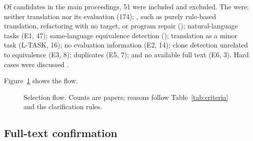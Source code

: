 Of  candidates in the main proceedings, 51 were included and  excluded. The  were: neither translation nor its evaluation (174); , such as purely rule-based translation, refactoring with no target, or program repair (); natural-language tasks (E1, 47); same-language equivalence detection (); translation as a minor task (L-TASK, 16); no evaluation information (E2, 14); clone detection unrelated to equivalence (E3, 8); duplicates (E5, 7); and no available full text (E6, 3). Hard cases were discussed .

\begin{added}
Figure~\ref{fig:flow} shows the flow. 
\end{added}

\begin{figure}[t]
  \centering
  
  \caption{\addedtag Selection flow. Counts are papers; reasons follow Table~\ref{tab:criteria} and the clarification rules.}
  \label{fig:flow}
\end{figure}

\subsection{Full-text confirmation}
\label{sec:fulltext}

